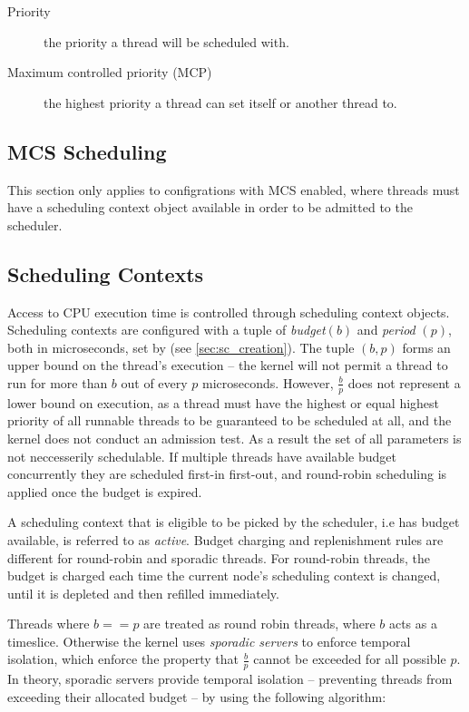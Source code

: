 \begin{description} \item[Priority] the priority a thread will be scheduled with.  \item[Maximum
controlled priority (MCP)] the highest priority a thread can set itself or another thread to.
\end{description}

\subsection{MCS Scheduling}

This section only applies to configrations with MCS enabled, where threads must have
a scheduling context object available in order to be admitted to the scheduler.

\subsection{Scheduling Contexts}
\label{sec:scheduling_contexts}

Access to CPU execution time is controlled through scheduling context objects.
Scheduling contexts are configured with a tuple of
\textit{budget}$(b)$ and \textit{period} $(p)$, both in microseconds, set by
 (see \autoref{sec:sc_creation}).
The tuple $(b, p)$ forms an upper bound on the thread's execution -- the kernel will not permit a
thread to run for more than $b$ out of every $p$ microseconds. However, $\frac{b}{p}$ does not
represent a lower bound on execution, as a thread must have the highest or equal highest priority
of all runnable threads to be guaranteed to be scheduled at all, and the kernel does not conduct
an admission test. As a result the set of all parameters is not neccesserily schedulable. If
multiple threads have available budget concurrently they are scheduled first-in first-out, and
round-robin scheduling is applied once the budget is expired.

A scheduling context that is eligible to be picked by the scheduler, i.e has budget available, is
referred to as \emph{active}.  Budget charging and replenishment rules are different for round-robin
and sporadic threads.  For round-robin threads, the budget is charged each time the current node's
scheduling context is changed, until it is depleted and then refilled immediately.

Threads where $b == p$ are treated as round robin threads, where $b$ acts as a timeslice.
Otherwise the kernel uses \emph{sporadic servers} to enforce temporal isolation, which enforce the
property that $\frac{b}{p}$ cannot be exceeded for all possible $p$.
In theory, sporadic servers provide temporal isolation -- preventing threads from exceeding their allocated budget -- by using the following algorithm:

